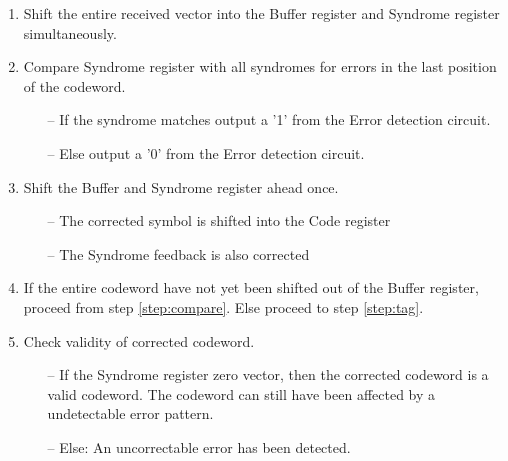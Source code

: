 \documentclass[MiniProjectMain]{subfiles}
\begin{document}
\begin{enumerate}

\item
Shift the entire received vector into the Buffer register and Syndrome register simultaneously.

\item
Compare Syndrome register with all syndromes for errors in the last position of the codeword.
\label{step:compare}

	\begin{itemize}
	\item[--]
	If the syndrome matches output a '1' from the Error detection circuit.
	
	\item[--]
	Else output a '0' from the Error detection circuit.
	\end{itemize}
	
\item
Shift the Buffer and Syndrome register ahead once.

	\begin{itemize}
	\item[--]
	The corrected symbol is shifted into the Code register
	\item[--]
	The Syndrome feedback is also corrected
	\end{itemize}
	
\item
If the entire codeword have not yet been shifted out of the Buffer register, proceed from step \ref{step:compare}. 
Else proceed to step \ref{step:tag}.

\item
Check validity of corrected codeword.
\label{step:tag}
	
	\begin{itemize}
	\item[--]
	If the Syndrome register zero vector, then the corrected codeword is a valid codeword.
	The codeword can still have been affected by a undetectable error pattern.
	
	\item[--]
	Else: An uncorrectable error has been detected.
	
	\end{itemize}





\end{enumerate}
\end{document}
